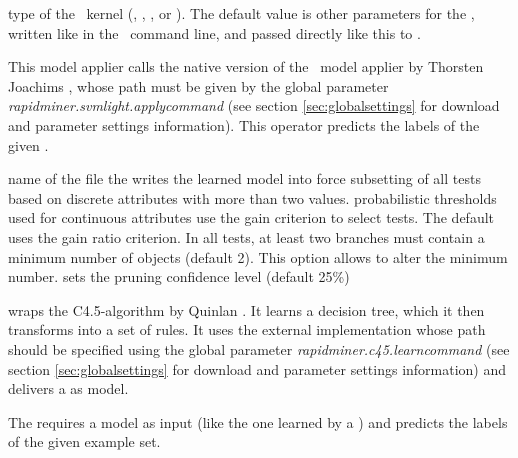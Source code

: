 \applierio

\begin{parameters}
 type of the \SVMlight\ kernel
(, 
, 
, or
). 
The default value is 
 other parameters for the \SVMlight,
written like in the \SVMlight\ command line, and passed directly like this to \SVMlight.
\end{parameters}

\opdescr This model applier calls the native version of the
\SVMlight\ model applier by Thorsten Joachims \cite{Joachims/99a},
whose path must be given by the global parameter {\em rapidminer.svmlight.applycommand} 
(see section \ref{sec:globalsettings} for download and parameter settings
information).
This operator predicts the labels of the given .





\learnerio

\begin{parameters}
 name of the file the  writes the learned model into
\optpar[s] force subsetting  of  all  tests   based   on discrete
attributes  with more than two values.
\optpar[p] probabilistic  thresholds  used  for  continuous attributes
\optpar[g] use the gain criterion  to  select  tests. The default uses
the gain ratio criterion.
\optpar[m] In all tests, at least two branches must contain a  minimum
number of objects (default 2). This option allows to alter the minimum
number.
\optpar[c] sets the pruning confidence level (default 25\%)
\end{parameters}

\opdescr {} wraps the C4.5-algorithm by Quinlan \cite{Quinlan/93b}.
It learns a decision tree, which it then transforms into a set of rules. 
It uses the external implementation whose path should be specified using the
global parameter {\em rapidminer.c45.learncommand} 
(see section \ref{sec:globalsettings} for download and parameter settings information) 
and delivers a  as model.




\applierio

\opdescr The  requires a  model as input
(like the one learned by a ) and predicts the labels of
the given example set.



